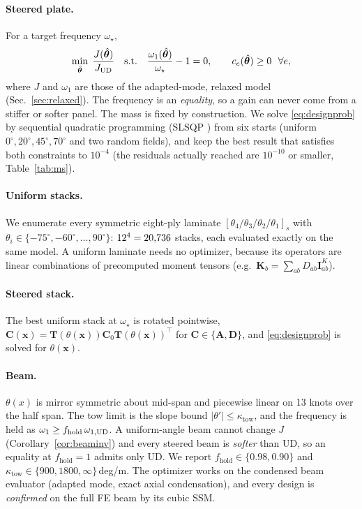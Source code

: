 \paragraph{Steered plate.} For a target frequency $\omega_\star$,
\begin{equation}
\min_{\hat{\bm\theta}}\;\frac{J(\hat{\bm\theta})}{J_{\mathrm{UD}}}\quad\text{s.t.}\quad
\frac{\omega_1(\hat{\bm\theta})}{\omega_\star}-1=0,\qquad c_e(\hat{\bm\theta})\ge0\ \ \forall e,
\label{eq:designprob}
\end{equation}
where $J$ and $\omega_1$ are those of the adapted-mode, relaxed model
(Sec.~\ref{sec:relaxed}). The frequency is an \emph{equality}, so a gain can never come
from a stiffer or softer panel. The mass is fixed by construction. We solve
\eqref{eq:designprob} by sequential quadratic programming (SLSQP \cite{kraft1988}) from six starts (uniform $0^\circ,20^\circ,45^\circ,70^\circ$ and
two random fields), and keep the best result that satisfies both constraints to $10^{-4}$ (the
residuals actually reached are $10^{-10}$ or smaller, Table~\ref{tab:ms}).

\paragraph{Uniform stacks.} We enumerate every symmetric eight-ply laminate
$[\theta_4/\theta_3/\theta_2/\theta_1]_s$ with $\theta_i\in\{-75^\circ,-60^\circ,\dots,90^\circ\}$:
$12^4=20{,}736$ stacks, each evaluated exactly on the same model. A uniform laminate
needs no optimizer, because its operators are linear combinations of precomputed moment
tensors (e.g.\ $\bm K_b=\sum_{ab}D_{ab}\bm I^K_{ab}$).

\paragraph{Steered stack.} The best uniform stack at $\omega_\star$ is rotated pointwise,
$\bm C(\bm x)=\bm T(\theta(\bm x))\bm C_0\bm T(\theta(\bm x))^{\!\top}$ for $\bm C\in\{\bm A,\bm
D\}$, and \eqref{eq:designprob} is solved for $\theta(\bm x)$.

\paragraph{Beam.} $\theta(x)$ is mirror symmetric about mid-span and piecewise linear on
13 knots over the half span. The tow limit is the slope bound
$|\theta'|\le\kappa_{\mathrm{tow}}$, and the frequency is held as
$\omega_1\ge f_{\mathrm{hold}}\,\omega_{1,\mathrm{UD}}$. A uniform-angle beam cannot change $J$
(Corollary~\ref{cor:beaminv}) and every steered beam is \emph{softer} than UD, so an
equality at $f_{\mathrm{hold}}=1$ admits only UD. We report
$f_{\mathrm{hold}}\in\{0.98,0.90\}$ and $\kappa_{\mathrm{tow}}\in\{900,1800,\infty\}$\,deg/m.
The optimizer works on the condensed beam evaluator (adapted mode, exact axial
condensation), and every design is \emph{confirmed} on the full FE beam by its cubic SSM.

